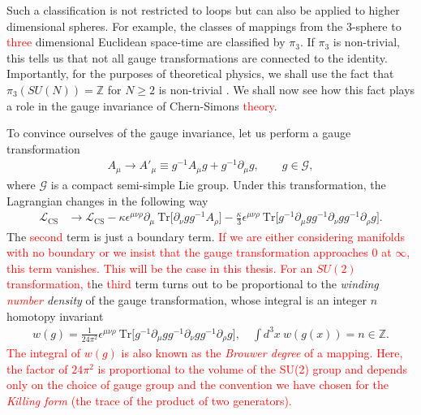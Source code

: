     Such a classification is not restricted to loops but can also be applied to higher dimensional spheres. For example, the classes of mappings from the 3-sphere to \textcolor{red}{three} dimensional Euclidean space-time are classified by $\pi_3$. If $\pi_3$ is non-trivial, this tells us that not all gauge transformations are connected to the identity. Importantly, for the purposes of theoretical physics, we shall use the fact that $\pi_3\left(SU(N) \right)=\mathbb{Z}$ for $N\geq2$ is non-trivial \cite{Toda1959}. We shall now see how this fact plays a role in the gauge invariance of Chern-Simons \textcolor{red}{theory}.

    To convince ourselves of the gauge invariance, let us perform a gauge transformation
    \begin{align}
        A_{\mu} \rightarrow A'_{\mu} \equiv g^{-1} A_{\mu} g + g^{-1}\partial_{\mu} g, \qquad g\in \mathcal{G},
    \end{align}
    where $\mathcal{G}$ is a compact semi-simple Lie group.
    Under this transformation, the Lagrangian changes in the following way
    \begin{align}
        \mathcal{L}_{\text{CS}} &\rightarrow \mathcal{L}_{\text{CS}}  - \kappa \epsilon^{\mu \nu \rho} \partial_{\mu} \ \mathrm{Tr} \bigg[\partial_{\nu} g g^{-1} A_{\rho}  \bigg] - \frac{\kappa}{3} \epsilon^{\mu \nu \rho} \ \mathrm{Tr} \bigg[g^{-1} \partial_{\mu} g g^{-1} \partial_{\nu} g g^{-1} \partial_{\rho} g\bigg].
    \end{align}
    The \textcolor{red}{second} term is just a boundary term. \textcolor{red}{If we are either considering manifolds with no boundary or we insist that the gauge transformation approaches $0$ at $\infty$, this term vanishes. This will be the case in this thesis.} \textcolor{red}{For an $SU(2)$ transformation, t}he \textcolor{red}{third} term turns out to be proportional to the \textit{winding \textcolor{red}{number} density} of the gauge transformation, whose integral is an integer $n$ homotopy invariant
    \begin{align}
        w(g) = \frac{1}{24 \pi^2} \epsilon^{\mu \nu \rho} \ \mathrm{Tr} \bigg[g^{-1}\partial_{\mu} g g^{-1} \partial_{\nu} g g^{-1} \partial_{\rho} g \bigg], \quad \int d^3x \ w(g(x)) = n \in \mathbb{Z}.
    \end{align}
    \textcolor{red}{The integral of $w(g)$ is also known as the \textit{Brouwer degree} of a mapping. Here, the factor of $24\pi^2$ is proportional to the volume of the SU(2) group and depends only on the choice of gauge group and the convention we have chosen for the \textit{Killing form} (the trace of the product of two generators). }

